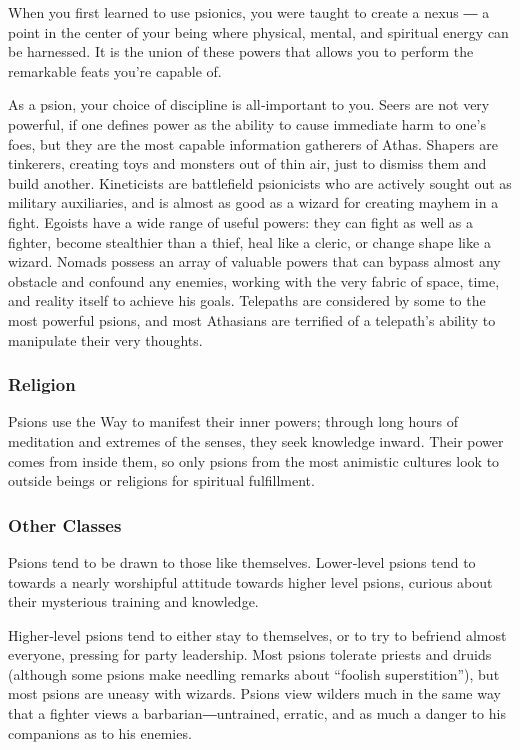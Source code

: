 When you first learned to use psionics, you were taught to create a nexus ― a point in the center of your being where physical, mental, and spiritual energy can be harnessed. It is the union of these powers that allows you to perform the remarkable feats you're capable of.

As a psion, your choice of discipline is all‐important to you. Seers are not very powerful, if one defines power as the ability to cause immediate harm to one's foes, but they are the most capable information gatherers of Athas. Shapers are tinkerers, creating toys and monsters out of thin air, just to dismiss them and build another. Kineticists are battlefield psionicists who are actively sought out as military auxiliaries, and is almost as good as a wizard for creating mayhem in a fight. Egoists have a wide range of useful powers: they can fight as well as a fighter, become stealthier than a thief, heal like a cleric, or change shape like a wizard. Nomads possess an array of valuable powers that can bypass almost any obstacle and confound any enemies, working with the very fabric of space, time, and reality itself to achieve his goals. Telepaths are considered by some to the most powerful psions, and most Athasians are terrified of a telepath's ability to manipulate their very thoughts.

\subsubsection{Religion}

Psions use the Way to manifest their inner powers; through long hours of meditation and extremes of the senses, they seek knowledge inward. Their power comes from inside them, so only psions from the most animistic cultures look to outside beings or religions for spiritual fulfillment.

\subsubsection{Other Classes}

Psions tend to be drawn to those like themselves. Lower‐level psions tend to towards a nearly worshipful attitude towards higher level psions, curious about their mysterious training and knowledge.

Higher‐level psions tend to either stay to themselves, or to try to befriend almost everyone, pressing for party leadership. Most psions tolerate priests and druids (although some psions make needling remarks about “foolish superstition”), but most psions are uneasy with wizards. Psions view wilders much in the same way that a fighter views a barbarian―untrained, erratic, and as much a danger to his companions as to his enemies.

